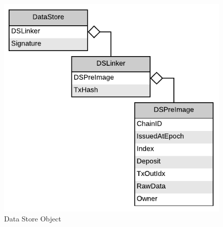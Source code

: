 \begin{figure}[H]
    \centering
    \includegraphics[scale=0.5]{figures/DataStore_Object.pdf}
    \caption{Data Store Object}
\end{figure}
